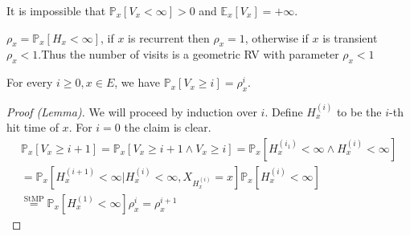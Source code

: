\begin{rmk}[]
It is impossible that $\mathbb{P}_{x} \left[ V_x<\infty \right] >0 $ and $\mathbb{E}_{x} \left[ V_x \right] =+\infty$.
\end{rmk}


\begin{defn}
	$\rho_x = \mathbb{P}_{x} \left[ H_x<\infty \right]$, if $x$ is recurrent then $\rho_x=1$, otherwise if $x$ is transient $\rho_x<1$.Thus the number of visits is a geometric RV with parameter $\rho_x<1$ 
\end{defn}

\begin{lemma}[]
	For every $i\geq 0, x \in E$, we have $\mathbb{P}_{x} \left[ V_x \geq i \right] = \rho_x^{i}$.
\end{lemma}

\begin{proof}[Proof (Lemma)]
	We will proceed by induction over $i$. Define $H_x^{(i)}$ to be the $i$-th hit time of $x$. For $i=0$ the claim is clear.
	\begin{gather}
		\mathbb{P}_{x} \left[ V_x \geq i+1 \right] = \mathbb{P}_{x} \left[ V_x \geq i+1 \wedge V_x \geq i \right] = \mathbb{P}_{x} \left[ H_x^{(i_1)} < \infty \wedge H_x^{(i)} < \infty \right] \\
		= \mathbb{P}_{x} \left[ H_x^{(i+1)} < \infty | H_x^{(i)} < \infty, X_{H_x^{(i)}}=x \right] \mathbb{P}_{x} \left[ H_x^{(i)} < \infty \right] \\
		\stackrel{\text{StMP}}{=} \mathbb{P}_{x} \left[ H_x^{(1)} < \infty \right] \rho_x^i = \rho_x^{i+1}   
	\end{gather}
\end{proof}

